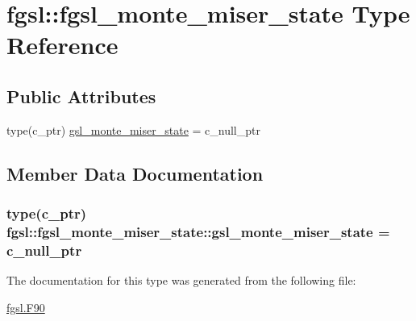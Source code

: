 \hypertarget{structfgsl_1_1fgsl__monte__miser__state}{}\section{fgsl\+:\+:fgsl\+\_\+monte\+\_\+miser\+\_\+state Type Reference}
\label{structfgsl_1_1fgsl__monte__miser__state}
\subsection*{Public Attributes}
\begin{DoxyCompactItemize}
\item 
type(c\+\_\+ptr) \hyperlink{structfgsl_1_1fgsl__monte__miser__state_ad26a705d8454348d24dcb1b07b710677}{gsl\+\_\+monte\+\_\+miser\+\_\+state} = c\+\_\+null\+\_\+ptr
\end{DoxyCompactItemize}


\subsection{Member Data Documentation}
\hypertarget{structfgsl_1_1fgsl__monte__miser__state_ad26a705d8454348d24dcb1b07b710677}{}
\subsubsection[{gsl\+\_\+monte\+\_\+miser\+\_\+state}]{\setlength{\rightskip}{0pt plus 5cm}type(c\+\_\+ptr) fgsl\+::fgsl\+\_\+monte\+\_\+miser\+\_\+state\+::gsl\+\_\+monte\+\_\+miser\+\_\+state = c\+\_\+null\+\_\+ptr}\label{structfgsl_1_1fgsl__monte__miser__state_ad26a705d8454348d24dcb1b07b710677}


The documentation for this type was generated from the following file\+:\begin{DoxyCompactItemize}
\item 
\hyperlink{fgsl_8F90}{fgsl.\+F90}\end{DoxyCompactItemize}

